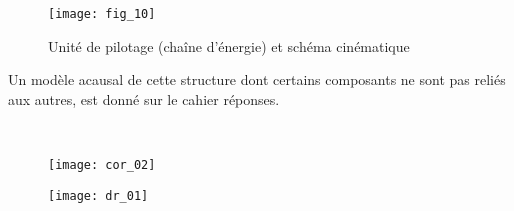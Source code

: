 \begin{multicols}{2}
\begin{figure}[H]
\centering
\texttt{[image: fig\_10]}

\caption{Unité de pilotage (chaîne d'énergie) et schéma cinématique  \label{fig_10}}
\end{figure}

Un modèle acausal de cette structure dont certains composants ne sont pas reliés aux autres, est
donné sur le cahier réponses.


\ifprof
\begin{corrige}
~\\

\begin{figure}[H]
\centering
\texttt{[image: cor\_02]}
\end{figure}
\end{corrige}
\else
\fi




\end{multicols}


\begin{figure}[H]
\centering
\texttt{[image: dr\_01]}
\end{figure}